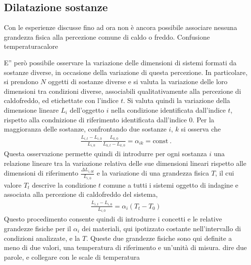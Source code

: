 \documentclass[letterpaper,10pt,italian]{jupyterBook}
\begin{document}
\subsection{Dilatazione sostanze}
\label{\detokenize{ch/thermodynamics/foundation-experiments:dilatazione-sostanze}}\label{\detokenize{ch/thermodynamics/foundation-experiments:physics-hs-thermodynamics-foundation-experiments-dilation}}
\sphinxAtStartPar
Con le esperienze discusse fino ad ora non è ancora possibile associare nessuna grandezza fisica alla percezione comune di caldo o freddo. Confusione temperatura\sphinxhyphen{}calore  

\sphinxAtStartPar
E” però possibile osservare la variazione delle dimensioni di sistemi formati da sostanze diverse, in occasione della variazione di questa percezione.
In particolare, si prendono \(N\) oggetti di sostanze diverse e si valuta la variazione delle loro dimensioni tra condizioni diverse, associabili qualitativamente alla percezione di caldo\sphinxhyphen{}freddo, ed etichettate con l’indice \(t\). Si valuta quindi la variazione della dimensione lineare \(L_i\) dell’oggetto \(i\) nella condizione identificata dall’indice \(t\), rispetto alla condnizione di riferimento identificata dall’indice \(0\). Per la maggioranza delle sostanze, confrontando due sostanze \(i\), \(k\) si osserva che
\begin{equation*}
\begin{split}\frac{L_{i,t} - L_{i,0}}{L_{i,0}} \frac{L_{k,0}}{L_{k,t}- L_{k,0}} = \alpha_{ik} = \text{const} \ .\end{split}
\end{equation*}
\sphinxAtStartPar
Questa osservazione permette quindi di introdurre per ogni sostanza \(i\) una relazione lineare tra la variazione relativa delle sue dimensioni lineari rispetto alle dimensioni di riferimento \(\frac{\Delta L_{i, 0t}}{L_{i,0}}\) e la variazione di una grandezza fisica \(T\), il cui valore \(T_t\) descrive la condizione \(t\) comune a tutti i sistemi oggetto di indagine e associata alla percezione di caldo\sphinxhyphen{}freddo del sistema,
\begin{equation*}
\begin{split}\frac{L_{i,t}-L_{i,0}}{L_{i,0}} = \alpha_i (T_t-T_0)\end{split}
\end{equation*}
\sphinxAtStartPar
Questo procedimento consente quindi di introdurre i concetti e le relative grandezze fisiche per il  \(\alpha_i\) dei materiali, qui ipotizzato costante nell’intervallo di condizioni analizzate, e la  \(T\). Queste due grandezze fisiche sono qui definite a meno di due valori, una temperatura di riferimento e un’unità di misura.  dire due parole, e collegare con le scale di temperatura
\end{document}

